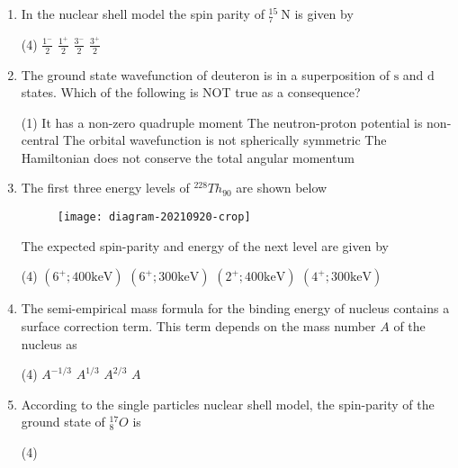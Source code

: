 \begin{enumerate}
	\item In the nuclear shell model the spin parity of ${ }_{7}^{15} \mathrm{~N}$ is given by
	{}
	\begin{tasks}(4)
		\task[\textbf{A.}] $\frac{1^{-}}{2}$
		\task[\textbf{B.}] $\frac{1^{+}}{2}$
		\task[\textbf{C.}] $\frac{3^{-}}{2}$
		\task[\textbf{D.}] $\frac{3^{+}}{2}$
	\end{tasks}
	\item The ground state wavefunction of deuteron is in a superposition of $\mathrm{s}$ and $\mathrm{d}$ states. Which of the following is NOT true as a consequence?
	{}
	\begin{tasks}(1)
		\task[\textbf{A.}]  It has a non-zero quadruple moment
		\task[\textbf{B.}] The neutron-proton potential is non-central
		\task[\textbf{C.}]  The orbital wavefunction is not spherically symmetric
		\task[\textbf{D.}]  The Hamiltonian does not conserve the total angular momentum
	\end{tasks}
	\item The first three energy levels of ${ }^{228} T h_{90}$ are shown below\\
	\begin{figure}[H]
		\centering
		\texttt{[image: diagram-20210920-crop]}
		\caption{}
		\label{}
	\end{figure}
	The expected spin-parity and energy of the next level are given by
	{}
	\begin{tasks}(4)
		\task[\textbf{A.}] $\left(6^{+} ; 400 \mathrm{keV}\right)$
		\task[\textbf{B.}] $\left(6^{+} ; 300 \mathrm{keV}\right)$
		\task[\textbf{C.}] $\left(2^{+} ; 400 \mathrm{keV}\right)$
		\task[\textbf{D.}] $\left(4^{+} ; 300 \mathrm{keV}\right)$
	\end{tasks}
	\item The semi-empirical mass formula for the binding energy of nucleus contains a surface correction term. This term depends on the mass number $A$ of the nucleus as
	{}
	\begin{tasks}(4)
		\task[\textbf{A.}] $A^{-1 / 3}$
		\task[\textbf{B.}] $A^{1 / 3}$
		\task[\textbf{C.}]  $A^{2 / 3}$
		\task[\textbf{D.}] $A$
	\end{tasks}
	\item According to the single particles nuclear shell model, the spin-parity of the ground state of ${ }_{8}^{17} O$ is
	{}
	\begin{tasks}(4)

\end{tasks}
\end{enumerate}
